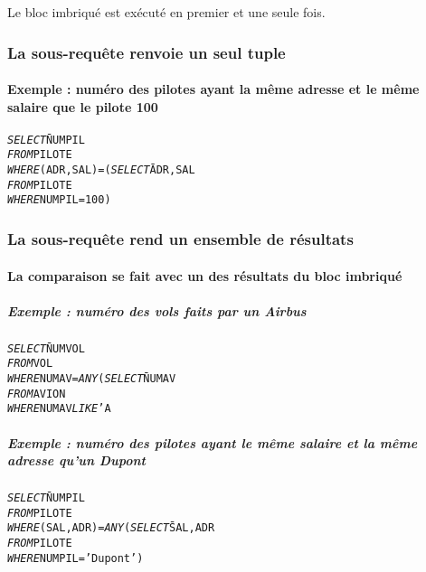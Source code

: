 \documentclass[10pt]{article}
\begin{document}
					Le bloc imbriqué est exécuté en premier et une seule fois.
					
			\subsubsection{La sous-requête renvoie un seul tuple}
				\paragraph{Exemple : numéro des pilotes ayant la même adresse et le même salaire que le pilote 100}
					\begin{alltt}
						\begin{tabbing}
							\emph{SELECT} \= NUMPIL\\
							\emph{FROM} \> PILOTE\\
							\emph{WHERE} \> (ADR,SAL)=(\=\emph{SELECT} \= ADR,SAL\=\\
													\>\>\emph{FROM}   \> PILOTE\\
													\>\>\emph{WHERE}  \> NUMPIL=100)
						\end{tabbing}
					\end{alltt}
					
			\subsubsection{La sous-requête rend un ensemble de résultats}
				\paragraph{La comparaison se fait avec un des résultats du bloc imbriqué}
					\subparagraph{Exemple : numéro des vols faits par un Airbus} \index{ANY}
						\begin{alltt}
							\begin{tabbing}
								\emph{SELECT} \= NUMVOL\\
								\emph{FROM} \> VOL\\
								\emph{WHERE} \> NUMAV=\emph{ANY} (\=\emph{SELECT} \= NUMAV\\
																 \>\>\emph{FROM} \> AVION\\
																 \>\>\emph{WHERE} \> NUMAV \emph{LIKE} 'A%')
							\end{tabbing}
						\end{alltt}
						
					\subparagraph{Exemple : numéro des pilotes ayant le même salaire et la même adresse qu'un Dupont}
						\begin{alltt}
							\begin{tabbing}
								\emph{SELECT} \= NUMPIL\\
								\emph{FROM} \> PILOTE\\
								\emph{WHERE} \> (SAL,ADR)=\emph{ANY} (\=\emph{SELECT} \= SAL,ADR\\
																 \>\>\emph{FROM} \> PILOTE\\
																 \>\>\emph{WHERE} \> NUMPIL='Dupont')
							\end{tabbing}
						\end{alltt}
						
\end{document}
